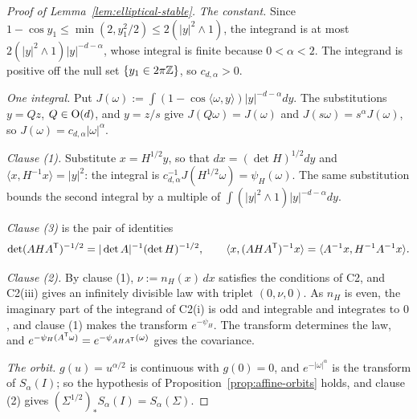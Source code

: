 \begin{proof}[Proof of Lemma~\ref{lem:elliptical-stable}]
\emph{The constant.} Since $1 - \cos y_1 \le \min(2, y_1^2/2) \le 2(|y|^2 \wedge 1)$, the integrand is
at most $2(|y|^2 \wedge 1)|y|^{-d-\alpha}$, whose integral is finite because $0 < \alpha < 2$. The
integrand is positive off the null set $\{y_1 \in 2\pi\mathbb{Z}\}$, so $c_{d,\alpha} > 0$.

\emph{One integral.} Put $J(\omega) := \int(1 - \cos\langle\omega,y\rangle)|y|^{-d-\alpha}dy$. The
substitutions $y = Qz$, $Q \in \mathrm{O}(d)$, and $y = z/s$ give $J(Q\omega) = J(\omega)$ and
$J(s\omega) = s^\alpha J(\omega)$, so $J(\omega) = c_{d,\alpha}|\omega|^\alpha$.

\emph{Clause (1).} Substitute $x = H^{1/2}y$, so that $dx = (\det H)^{1/2}dy$ and
$\langle x,H^{-1}x\rangle = |y|^2$: the integral is $c_{d,\alpha}^{-1}J(H^{1/2}\omega) = \psi_H(\omega)$.
The same substitution bounds the second integral by a multiple of
$\int(|y|^2 \wedge 1)|y|^{-d-\alpha}dy$.

\emph{Clause (3)} is the pair of identities
\[
  \det(AHA^{\mathsf{T}})^{-1/2} = |\det A|^{-1}(\det H)^{-1/2} ,
  \qquad
  \langle x,(AHA^{\mathsf{T}})^{-1}x\rangle = \langle A^{-1}x,H^{-1}A^{-1}x\rangle .
\]

\emph{Clause (2).} By clause (1), $\nu := n_H(x)\,dx$ satisfies the conditions of C2, and C2(iii) gives an
infinitely divisible law with triplet $(0, \nu, 0)$. As $n_H$ is even, the imaginary part of the
integrand of C2(i) is odd and integrable and integrates to $0$, and clause (1) makes the transform
$e^{-\psi_H}$. The transform determines the law, and
$e^{-\psi_H(A^{\mathsf{T}}\omega)} = e^{-\psi_{AHA^{\mathsf{T}}}(\omega)}$ gives the covariance.

\emph{The orbit.} $g(u) = u^{\alpha/2}$ is continuous with $g(0) = 0$, and $e^{-|\omega|^\alpha}$ is the
transform of $S_\alpha(I)$; so the hypothesis of Proposition~\ref{prop:affine-orbits} holds, and
clause (2) gives $(\Sigma^{1/2})_*S_\alpha(I) = S_\alpha(\Sigma)$.
\end{proof}

